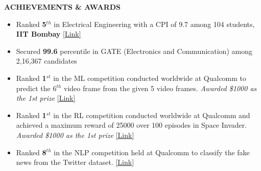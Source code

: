 \documentclass{article}
\begin{document}
  \begin{theorem}
   \vspace{-0.7mm}
\begin{center}
\textbf{ACHIEVEMENTS \& AWARDS
}\end{center}  
\vspace{-0.7mm}    
   \end{theorem}
\vspace{-3mm}
\begin{itemize}
\setlength{\itemsep}{-0.10em}

\item Ranked \textbf{5$^{th}$}  in Electrical Engineering with a CPI of 9.7 among 104 students, \textbf{IIT Bombay}   
\hfill{\href{https://drive.google.com/file/d/1U6Im2h50TI0gOA6D1DFieJkynd2bFfO8/view?usp=sharing}{[Link]}}

 

\item Secured \textbf{99.6} percentile in GATE (Electronics and Communication) among 2,16,367 candidates


\item Ranked \textbf{1$^{st}$} in the ML competition conducted  worldwide at Qualcomm to predict the {6$^{th}$} video frame from the given 5 video frames. \textit{Awarded \$1000 as the 1st prize} 
\hfill{\href{https://drive.google.com/file/d/1uwSr-1dlImn5JYRzPpn62ublzCWKSGr0/view?usp=sharing}{[Link]}}



\item Ranked \textbf{1$^{st}$} in the RL competition conducted worldwide at Qualcomm  and achieved a maximum reward of 25000 over 100 episodes in Space Invader.  \textit{Awarded \$1000 as the 1st prize} 
\hfill{\href{https://drive.google.com/file/d/13voQkZ9kiybTD-pCkeTBRxmi9IeBtqnG/view?usp=sharing}{[Link]}}





\item Ranked \textbf{8$^{th}$} in the NLP competition held at Qualcomm to classify the fake news from the Twitter dataset.
\hfill{\href{https://drive.google.com/file/d/1mOlilPLZSuHSyqRIVukRvXs_700Hmz5I/view?usp=sharing}{[Link]}}




\end{itemize}
\vspace{-2mm}


\end{document}
